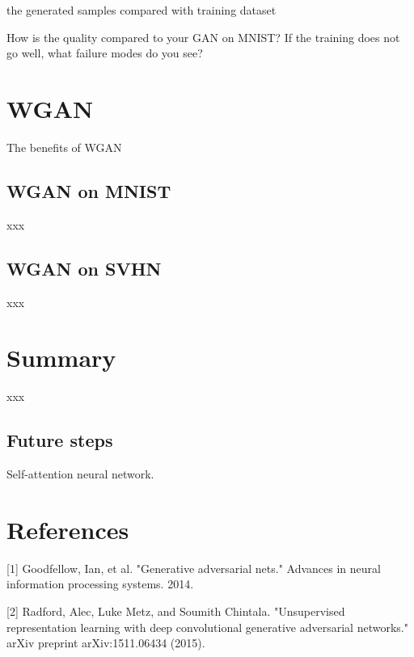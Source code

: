 \documentclass{article}
\begin{document}
the generated samples compared with training dataset

How is the quality compared to your GAN on MNIST? If the training does not go well, what failure modes do you see?

\section{WGAN}

The benefits of WGAN

\subsection{WGAN on MNIST}

xxx

\subsection{WGAN on SVHN}

xxx

\section{Summary}

xxx

\subsection{Future steps}

Self-attention neural network.

\section*{References}

[1] Goodfellow, Ian, et al. "Generative adversarial nets." Advances in neural information processing systems. 2014.

[2] Radford, Alec, Luke Metz, and Soumith Chintala. "Unsupervised representation learning with deep convolutional generative adversarial networks." arXiv preprint arXiv:1511.06434 (2015).
\end{document}
